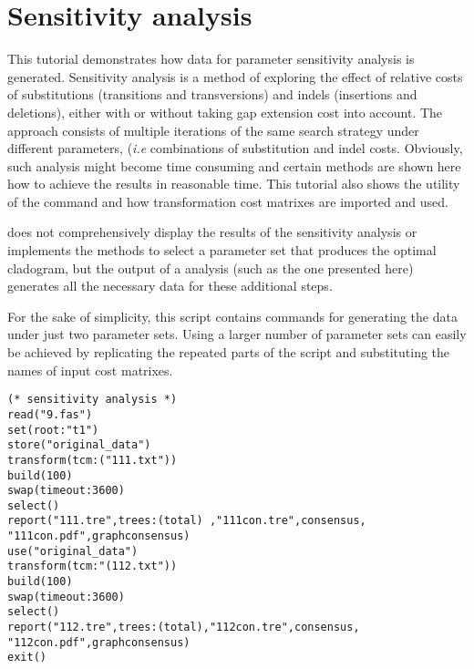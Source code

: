 \section{Sensitivity analysis}{\label{tutorial 5}}

This tutorial demonstrates how data for parameter sensitivity analysis is generated. Sensitivity analysis 
\cite{wheeler1995} is a method of exploring the effect of relative costs of substitutions (transitions and 
transversions) and indels (insertions and deletions), either with or without taking gap extension cost into 
account. The approach consists of multiple iterations of the same search strategy under different parameters, 
(\emph{i.e} combinations of substitution and indel costs. Obviously, such analysis might become time 
consuming and certain methods are shown here how to achieve the results in reasonable time. This tutorial also
 shows the utility of the command  and how transformation cost matrixes are imported and 
 used.

\poy does not comprehensively display the results of the sensitivity analysis or implements the methods to select 
a parameter set that produces the optimal cladogram, but the output of a \poy analysis (such as the one 
presented here) generates all the necessary data for these additional steps.

For the sake of simplicity, this script contains commands for generating the data under just two parameter  sets. 
Using a larger number of parameter sets can easily be achieved by replicating the repeated parts of the script 
and substituting the names of input cost matrixes.

\begin{verbatim}
(* sensitivity analysis *)
read("9.fas")
set(root:"t1")
store("original_data")
transform(tcm:("111.txt"))
build(100)
swap(timeout:3600)
select()
report("111.tre",trees:(total) ,"111con.tre",consensus,
"111con.pdf",graphconsensus)
use("original_data")
transform(tcm:"(112.txt"))
build(100)
swap(timeout:3600)
select()
report("112.tre",trees:(total),"112con.tre",consensus,
"112con.pdf",graphconsensus)
exit()
\end{verbatim}

